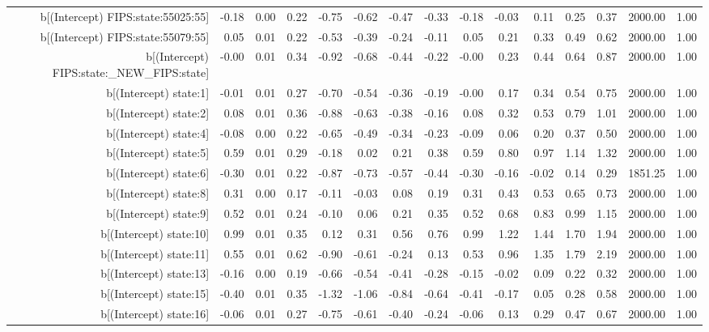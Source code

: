 \begin{table}[ht]
\begin{tabular}{rrrrrrrrrrrrrrr}
  b[(Intercept) FIPS:state:55025:55] & -0.18 & 0.00 & 0.22 & -0.75 & -0.62 & -0.47 & -0.33 & -0.18 & -0.03 & 0.11 & 0.25 & 0.37 & 2000.00 & 1.00 \\ 
  b[(Intercept) FIPS:state:55079:55] & 0.05 & 0.01 & 0.22 & -0.53 & -0.39 & -0.24 & -0.11 & 0.05 & 0.21 & 0.33 & 0.49 & 0.62 & 2000.00 & 1.00 \\ 
  b[(Intercept) FIPS:state:\_NEW\_FIPS:state] & -0.00 & 0.01 & 0.34 & -0.92 & -0.68 & -0.44 & -0.22 & -0.00 & 0.23 & 0.44 & 0.64 & 0.87 & 2000.00 & 1.00 \\ 
  b[(Intercept) state:1] & -0.01 & 0.01 & 0.27 & -0.70 & -0.54 & -0.36 & -0.19 & -0.00 & 0.17 & 0.34 & 0.54 & 0.75 & 2000.00 & 1.00 \\ 
  b[(Intercept) state:2] & 0.08 & 0.01 & 0.36 & -0.88 & -0.63 & -0.38 & -0.16 & 0.08 & 0.32 & 0.53 & 0.79 & 1.01 & 2000.00 & 1.00 \\ 
  b[(Intercept) state:4] & -0.08 & 0.00 & 0.22 & -0.65 & -0.49 & -0.34 & -0.23 & -0.09 & 0.06 & 0.20 & 0.37 & 0.50 & 2000.00 & 1.00 \\ 
  b[(Intercept) state:5] & 0.59 & 0.01 & 0.29 & -0.18 & 0.02 & 0.21 & 0.38 & 0.59 & 0.80 & 0.97 & 1.14 & 1.32 & 2000.00 & 1.00 \\ 
  b[(Intercept) state:6] & -0.30 & 0.01 & 0.22 & -0.87 & -0.73 & -0.57 & -0.44 & -0.30 & -0.16 & -0.02 & 0.14 & 0.29 & 1851.25 & 1.00 \\ 
  b[(Intercept) state:8] & 0.31 & 0.00 & 0.17 & -0.11 & -0.03 & 0.08 & 0.19 & 0.31 & 0.43 & 0.53 & 0.65 & 0.73 & 2000.00 & 1.00 \\ 
  b[(Intercept) state:9] & 0.52 & 0.01 & 0.24 & -0.10 & 0.06 & 0.21 & 0.35 & 0.52 & 0.68 & 0.83 & 0.99 & 1.15 & 2000.00 & 1.00 \\ 
  b[(Intercept) state:10] & 0.99 & 0.01 & 0.35 & 0.12 & 0.31 & 0.56 & 0.76 & 0.99 & 1.22 & 1.44 & 1.70 & 1.94 & 2000.00 & 1.00 \\ 
  b[(Intercept) state:11] & 0.55 & 0.01 & 0.62 & -0.90 & -0.61 & -0.24 & 0.13 & 0.53 & 0.96 & 1.35 & 1.79 & 2.19 & 2000.00 & 1.00 \\ 
  b[(Intercept) state:13] & -0.16 & 0.00 & 0.19 & -0.66 & -0.54 & -0.41 & -0.28 & -0.15 & -0.02 & 0.09 & 0.22 & 0.32 & 2000.00 & 1.00 \\ 
  b[(Intercept) state:15] & -0.40 & 0.01 & 0.35 & -1.32 & -1.06 & -0.84 & -0.64 & -0.41 & -0.17 & 0.05 & 0.28 & 0.58 & 2000.00 & 1.00 \\ 
  b[(Intercept) state:16] & -0.06 & 0.01 & 0.27 & -0.75 & -0.61 & -0.40 & -0.24 & -0.06 & 0.13 & 0.29 & 0.47 & 0.67 & 2000.00 & 1.00 \\ 

\end{tabular}
\end{table}
